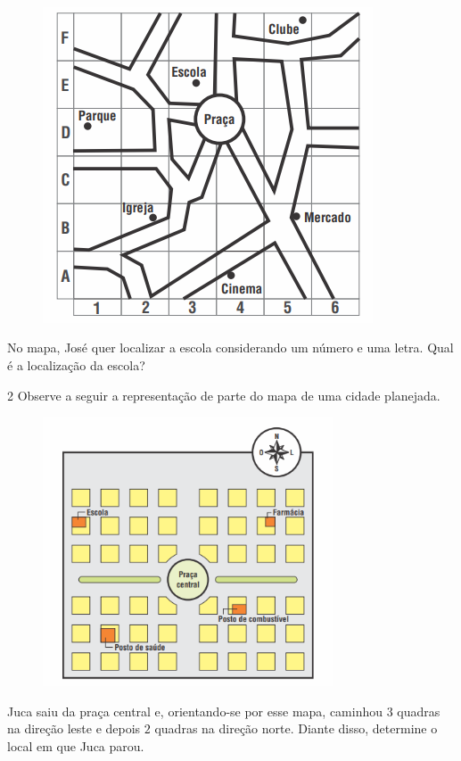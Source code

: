 {{{{\begin{figure}[H]
\centering\includegraphics[width=3.86042in,height=3.68611in]{./imgSAEB_6_MAT/media/image64.png}
\end{figure}

No mapa, José quer localizar a escola considerando um número e uma letra.
Qual é a localização da escola?


\num{2}  Observe a seguir a representação de parte do mapa de uma cidade
planejada.

\begin{figure}[H]
\centering\includegraphics[width=3.39535in,height=3.14326in]{./imgSAEB_6_MAT/media/image65.png}
\end{figure}

Juca saiu da praça central e, orientando-se por esse mapa, caminhou $3$
quadras na direção leste e depois $2$ quadras na direção norte. Diante disso,
determine o local em que Juca parou.

}}}}
